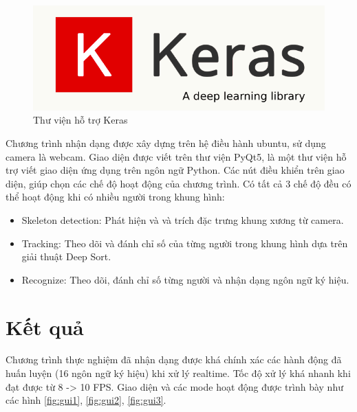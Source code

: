 \FloatBarrier
\begin{figure}[htp]
\begin{center}
\includegraphics[scale=0.5]{chap6/c6_figs/keras.png}
\end{center}
\caption{Thư viện hỗ trợ Keras}
\label{fig:keras}
\end{figure}
\FloatBarrier

Chương trình nhận dạng được xây dựng trên hệ điều hành ubuntu, sử dụng camera là webcam. Giao diện được viết trên thư viện PyQt5, là một thư viện hỗ trợ viết giao diện ứng dụng trên ngôn ngữ Python. Các nút điều khiển trên giao diện, giúp chọn các chế độ hoạt động của chương trình. Có tất cả 3 chế độ đều có thể hoạt động khi có nhiều người trong khung hình:
\begin{itemize}
\item Skeleton detection: Phát hiện và và trích đặc trưng khung xương từ camera.
\item Tracking: Theo dõi và đánh chỉ số của từng người trong khung hình dựa trên giải thuật Deep Sort.
\item Recognize: Theo dõi, đánh chỉ số từng người và nhận dạng ngôn ngữ ký hiệu.
\end{itemize}

\section{Kết quả}
Chương trình thực nghiệm đã nhận dạng được khá chính xác các hành động đã huấn luyện (16 ngôn ngữ ký hiệu) khi xử lý realtime. Tốc độ xử lý khá nhanh khi đạt được từ 8 -> 10 FPS. Giao diện và các mode hoạt động được trình bày như các hình \ref{fig:gui1}, \ref{fig:gui2}, \ref{fig:gui3}.


